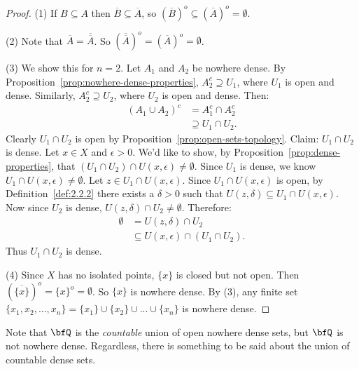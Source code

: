         \begin{proof}
            (1) If $B \subseteq A$ then $\overline{B} \subseteq \overline{A}$, so $(\overline{B})^o \subseteq (\overline{A})^o = \emptyset$.
            
            (2) Note that $\overline{A} = \overline{\overline{A}}$. So $(\overline{\overline{A}})^o = (\overline{A})^o = \emptyset$.

            (3) We show this for $n=2$. Let $A_1$ and $A_2$ be nowhere dense. By Proposition~\ref{prop:nowhere-dense-properties}, $A_2^c \supseteq U_1$, where $U_1$ is open and dense. Similarly, $A_2^c \supseteq U_2$, where $U_2$ is open and dense. Then:
                \begin{equation*}
                \begin{split}
                    (A_1 \cup A_2)^c 
                    & = A_1^c \cap A_2^c \\
                    & \supseteq U_1 \cap U_2.
                \end{split}
                \end{equation*}
            Clearly $U_1 \cap U_2$ is open by Proposition~\ref{prop:open-sets-topology}. Claim: $U_1 \cap U_2$ is dense. Let $x \in X$ and $\epsilon > 0$. We'd like to show, by Proposition~\ref{prop:dense-properties}, that $(U_1 \cap U_2) \cap U(x,\epsilon) \neq \emptyset$. Since $U_1$ is dense, we know $U_1 \cap U(x,\epsilon) \neq \emptyset$. Let $z \in U_1 \cap U(x,\epsilon)$. Since $U_1 \cap U(x,\epsilon)$ is open, by Definition~\ref{def:2.2.2} there exists a $\delta > 0$ such that $U(z,\delta) \subseteq U_1 \cap U(x,\epsilon)$. Now since $U_2$ is dense, $U(z,\delta) \cap U_2 \neq \emptyset$. Therefore:
                \begin{equation*}
                \begin{split}
                    \emptyset 
                    & = U(z,\delta) \cap U_2 \\
                    & \subseteq U(x,\epsilon) \cap (U_1 \cap U_2).
                \end{split}
                \end{equation*}
            Thus $U_1 \cap U_2$ is dense.

            (4) Since $X$ has no isolated points, $\{x\}$ is closed but not open. Then $(\overline{\{x\}})^o = \{x\}^o = \emptyset$. So $\{x\}$ is nowhere dense. By (3), any finite set $\{x_1,x_2,...,x_n\} = \{x_1\} \cup \{x_2\} \cup ... \cup \{x_n\}$ is nowhere dense.
        \end{proof}

    Note that $\bfQ$ is the \textit{countable} union of open nowhere dense sets, but $\bfQ$ is not nowhere dense. Regardless, there is something to be said about the union of countable dense sets.



    
    